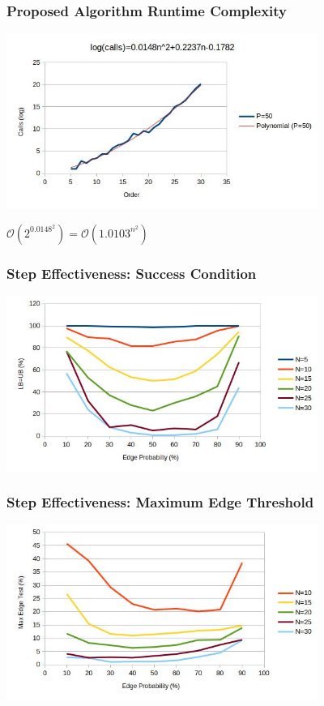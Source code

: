 \documentclass{beamer}
\newcommand{\BO}{\mathcal{O}}
\begin{document}
\begin{frame}
  \frametitle{Proposed Algorithm Runtime Complexity}
  \begin{center}
    \includegraphics[width=4in]{../final/qz_runtime}

    \bigskip

    \(\BO(2^{0.0148^2})=\BO(1.0103^{n^2})\)
  \end{center}
\end{frame}

\begin{frame}
  \frametitle{Step Effectiveness: Success Condition}
  \begin{center}
    \includegraphics[width=4in]{../final/qz_match}
  \end{center}
\end{frame}

\begin{frame}
  \frametitle{Step Effectiveness: Maximum Edge Threshold}
  \begin{center}
    \includegraphics[width=4in]{../final/qz_edges}
  \end{center}
\end{frame}
\end{document}
